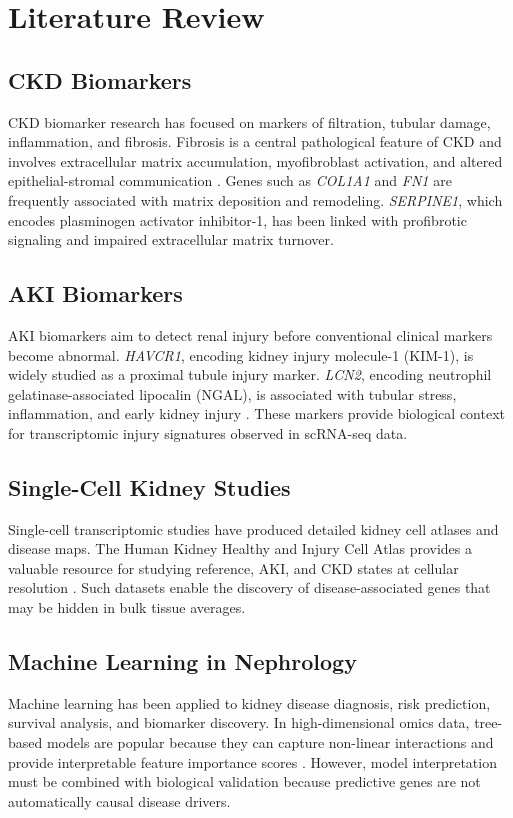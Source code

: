 \chapter{Literature Review}
\section{CKD Biomarkers}
CKD biomarker research has focused on markers of filtration, tubular damage, inflammation, and fibrosis. Fibrosis is a central pathological feature of CKD and involves extracellular matrix accumulation, myofibroblast activation, and altered epithelial-stromal communication \cite{liu2011fibrosis}. Genes such as \textit{COL1A1} and \textit{FN1} are frequently associated with matrix deposition and remodeling. \textit{SERPINE1}, which encodes plasminogen activator inhibitor-1, has been linked with profibrotic signaling and impaired extracellular matrix turnover.

\section{AKI Biomarkers}
AKI biomarkers aim to detect renal injury before conventional clinical markers become abnormal. \textit{HAVCR1}, encoding kidney injury molecule-1 (KIM-1), is widely studied as a proximal tubule injury marker. \textit{LCN2}, encoding neutrophil gelatinase-associated lipocalin (NGAL), is associated with tubular stress, inflammation, and early kidney injury \cite{devarajan2008ngal}. These markers provide biological context for transcriptomic injury signatures observed in scRNA-seq data.

\section{Single-Cell Kidney Studies}
Single-cell transcriptomic studies have produced detailed kidney cell atlases and disease maps. The Human Kidney Healthy and Injury Cell Atlas provides a valuable resource for studying reference, AKI, and CKD states at cellular resolution \cite{lake2023kidneyatlas}. Such datasets enable the discovery of disease-associated genes that may be hidden in bulk tissue averages.

\section{Machine Learning in Nephrology}
Machine learning has been applied to kidney disease diagnosis, risk prediction, survival analysis, and biomarker discovery. In high-dimensional omics data, tree-based models are popular because they can capture non-linear interactions and provide interpretable feature importance scores \cite{breiman2001randomforest}. However, model interpretation must be combined with biological validation because predictive genes are not automatically causal disease drivers.

